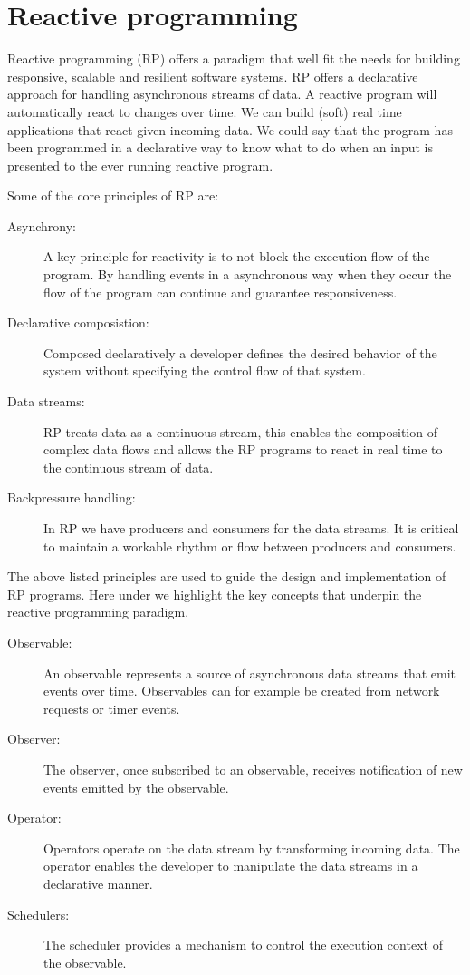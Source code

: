 \documentclass[a4paper]{book}
\begin{document}
\chapter{Reactive programming}
Reactive programming (RP) offers a paradigm that well fit the needs for building responsive, scalable and resilient software systems. RP offers a declarative approach for handling asynchronous streams of data. A reactive program will automatically react to changes over time. We can build (soft) real time applications that react given incoming data. We could say that the program has been programmed in a declarative way to know what to do when an input is presented to the ever running reactive program. 

Some of the core principles of RP are: 
\begin{description}
	\item[Asynchrony:] A key principle for reactivity is to not block the execution flow of the program. By handling events in a asynchronous way when they occur the flow of the program can continue and guarantee responsiveness.
	\item[Declarative composistion:]  Composed declaratively a developer defines the desired behavior of the system without specifying the control flow of that system.
	\item[Data streams:] RP treats data as a continuous stream, this enables the composition of complex data flows and allows the RP programs to react in real time to the continuous stream of data.
	\item[Backpressure handling:] In RP we have producers and consumers for the data streams. It is critical to maintain a workable rhythm or flow between producers and consumers.
\end{description}

The above listed principles are used to guide the design and implementation of RP programs. Here under we highlight the key concepts that underpin the reactive programming paradigm.

\begin{description}
	\item[Observable:] An observable represents a source of asynchronous data streams that emit events over time. Observables can for example be created from network requests or timer events.
	\item[Observer:] The observer, once subscribed to an observable, receives notification of new events emitted by the observable.
	\item[Operator:] Operators operate on the data stream by transforming incoming data. The operator enables the developer to manipulate the data streams in a declarative manner.  
	\item[Schedulers:] The scheduler provides a mechanism to control the execution context of the observable. 
\end{description}
\end{document}
